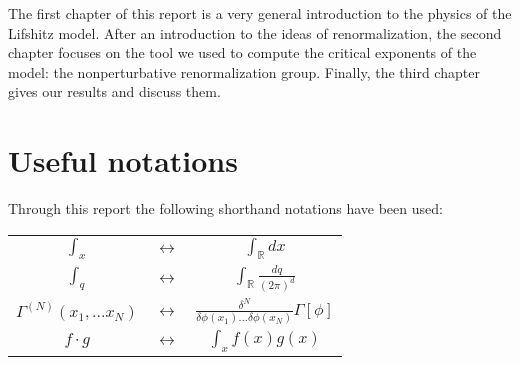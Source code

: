 The first chapter of this report is a very general introduction to the physics of the Lifshitz model. 
After an introduction to the ideas of renormalization, the second chapter focuses on the tool we used to compute the critical exponents of the model: the nonperturbative renormalization group. 
Finally, the third chapter gives our results and discuss them.



\section*{Useful notations}
Through this report the following shorthand notations have been used:

\begin{center}
\begin{tabular}{ccc}
$\int_x$ & $\leftrightarrow$ &  $\int_{\mathds{R}} dx$ \\ 
$\int_q$ & $\leftrightarrow$ &  $\int_{\mathds{R}} \frac{dq}{(2\pi)^d}$ \\ 
$\Gamma^{(N)}(x_1,...x_N)$ & $\leftrightarrow$ &  $\frac{\delta^N }{\delta \phi(x_1) ... \delta \phi(x_N)} \Gamma[\phi]$ \\ 
$f \cdot g$ & $\leftrightarrow$ &  $\int_x f(x) g(x)$ \\ 
\end{tabular} 
\end{center}

